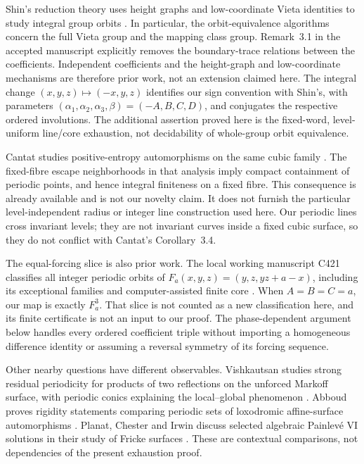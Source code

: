Shin's reduction theory uses height graphs and low-coordinate Vieta
identities to study integral group orbits
\citep[Theorems 1.1--1.3 and \S2]{shin2026character}.
In particular, the orbit-equivalence algorithms concern the full
Vieta group and the mapping class group. Remark~3.1 in the accepted
manuscript explicitly removes the boundary-trace relations between
the coefficients. Independent coefficients and the height-graph and
low-coordinate mechanisms are therefore prior work, not an extension
claimed here. The integral change \((x,y,z)\mapsto(-x,y,z)\) identifies
our sign convention with Shin's, with parameters
\((\alpha_1,\alpha_2,\alpha_3,\beta)=(-A,B,C,D)\), and conjugates
the respective ordered involutions. The additional assertion proved
here is the fixed-word, level-uniform line/core exhaustion, not
decidability of whole-group orbit equivalence.

Cantat studies positive-entropy automorphisms on the same cubic family
\citep[Proposition 2.2 and \S3]{cantat2009bers}.
The fixed-fibre escape neighborhoods in that analysis imply compact
containment of periodic points, and hence integral finiteness on a fixed
fibre. This consequence is already available and is not our novelty
claim. It does not furnish the particular level-independent radius or
integer line construction used here. Our periodic lines cross invariant
levels; they are not invariant curves inside a fixed cubic surface, so
they do not conflict with Cantat's Corollary~3.4.

The equal-forcing slice is also prior work. The local working manuscript
C421 classifies all integer periodic orbits of
\(F_a(x,y,z)=(y,z,yz+a-x)\), including its exceptional families and
computer-assisted finite core \citep{c4212026integral}.
When \(A=B=C=a\), our map is exactly \(F_a^3\). That slice is not counted
as a new classification here, and its finite certificate is not an
input to our proof. The phase-dependent argument below handles every
ordered coefficient triple without importing a homogeneous difference
identity or assuming a reversal symmetry of its forcing sequence.

Other nearby questions have different observables. Vishkautsan studies
strong residual periodicity for products of two reflections on the
unforced Markoff surface, with periodic conics explaining the
local--global phenomenon \citep{vishkautsan2016residual}.
Abboud proves rigidity statements comparing periodic sets of
loxodromic affine-surface automorphisms
\citep[Theorem A]{abboud2025rigidity}.
Planat, Chester and Irwin discuss selected algebraic Painlev\'e VI
solutions in their study of Fricke surfaces
\citep{planat2024dynamics}. These are contextual comparisons, not
dependencies of the present exhaustion proof.

